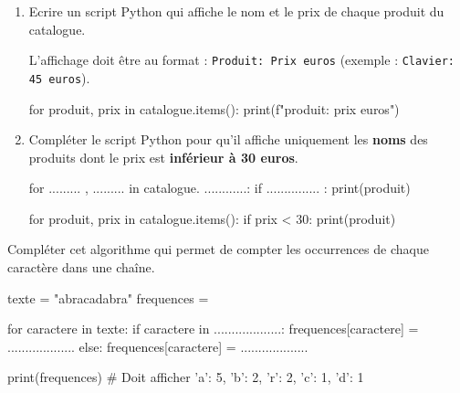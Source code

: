 \documentclass[11pt, a4paper]{report}
\def\ptsexoC{1}
\begin{document}
\begin{enumerate}
    \item Ecrire un script Python qui affiche le nom et le prix de chaque produit du catalogue.


    L'affichage doit être au format : \texttt{Produit: Prix euros} (exemple : \texttt{Clavier: 45 euros}).


    \begin{blocvisible}[height=3]
            {\quad }
          \begin{CodePythontexAlt}[TaillePolice=\large, Largeur=1\linewidth,Centre,Lignes=true,PremLigne=1]{}
for produit, prix in catalogue.items():
    print(f"{produit}: {prix} euros")

    \end{CodePythontexAlt}
        \end{blocvisible}
  

    \medskip
\item Compléter le script Python pour qu'il affiche uniquement les \textbf{noms} des produits dont le prix est \textbf{inférieur à 30 euros}.


\begin{CodePythontexAlt}[TaillePolice=\large, Largeur=1\linewidth,Centre,Lignes=true,PremLigne=1]{}
for ......... , ......... in catalogue. ............:
    if ............... :
        print(produit)

    \end{CodePythontexAlt}

    \begin{blocvisible}[height=3]
            {\quad }
          \begin{CodePythontexAlt}[TaillePolice=\large, Largeur=1\linewidth,Centre,Lignes=true,PremLigne=1]{}
for produit, prix in catalogue.items():
    if prix < 30:
        print(produit)

    \end{CodePythontexAlt}
        \end{blocvisible}

\end{enumerate}


\pagebreak

\exods{\ptsexoC} 

Compléter cet algorithme qui permet de compter les occurrences de chaque caractère dans une chaîne.

\begin{CodePythontexAlt}[TaillePolice=\large, Largeur=1\linewidth,Centre,Lignes=true,PremLigne=1]{}
texte = "abracadabra"
frequences = {}

for caractere in texte:
    if caractere in ...................:
        frequences[caractere] = ...................
    else:
        frequences[caractere] = ...................

print(frequences) # Doit afficher {'a': 5, 'b': 2, 'r': 2, 'c': 1, 'd': 1}
\end{CodePythontexAlt}
\end{document}
